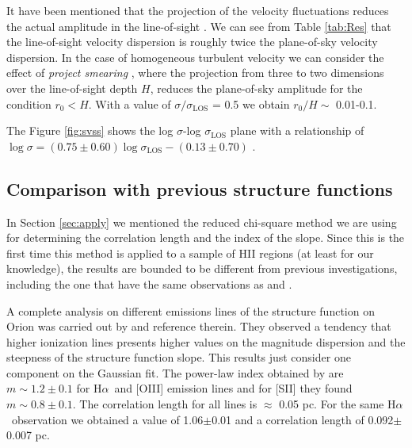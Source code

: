 \documentclass[fleqn,usenatbib, useAMS, a4paper]{mnras}
\newcommand\halpha{H${\alpha}$}
\begin{document}
It have been mentioned that the projection of the velocity fluctuations reduces the actual amplitude in the line-of-sight \citep{1984ApJ...277..556S,arthur2016turbulence}.
We can see from Table \ref{tab:Res} that the line-of-sight velocity dispersion is roughly twice the plane-of-sky velocity dispersion.
In the case of homogeneous turbulent velocity we can consider the effect of \textit{project smearing} \citep{1984ApJ...277..556S}, where the projection from three to two dimensions over the line-of-sight depth \(H\), reduces the plane-of-sky amplitude for the condition \(r_{0} < H\).
With a value of \(\sigma / \sigma_{\text{LOS}}\) = 0.5 we obtain \(r_{0} / H \sim\) 0.01-0.1.

The Figure \ref{fig:svss} shows the log $\sigma$-log $\sigma_{\text{LOS}}$ plane with a relationship of $\log \sigma = (0.75 \pm 0.60) \log \sigma_{\text{LOS}}-(0.13 \pm 0.70)$ .

\subsection{Comparison with previous structure functions}

In Section \ref{sec:apply} we mentioned the reduced chi-square method we are using for determining the correlation length and the index of the slope. Since this is the first time this method is applied to a sample of HII regions (at least for our knowledge), the results are bounded to be different from previous investigations, including the one that have the same observations as \citet{arthur2016turbulence} and \citet{2019arXiv191203543M}. 

A complete analysis on different emissions lines of the structure function on Orion was carried out by \citet{arthur2016turbulence} and reference therein. 
They observed a tendency that higher ionization lines presents higher values on the magnitude dispersion and the steepness of the structure function slope. 
This results just consider one component on the Gaussian fit. 
The power-law index obtained by \citet{arthur2016turbulence} are \(m \sim 1.2 \pm 0.1\) for \halpha\ and [OIII] emission lines and for [SII] they found \(m \sim 0.8 \pm 0.1\). 
The correlation length for all lines is \(\approx\) 0.05 pc. For the same \halpha\ observation we obtained a value of 1.06$\pm$0.01 and a correlation length of 0.092$\pm$0.007 pc. 
\end{document}
